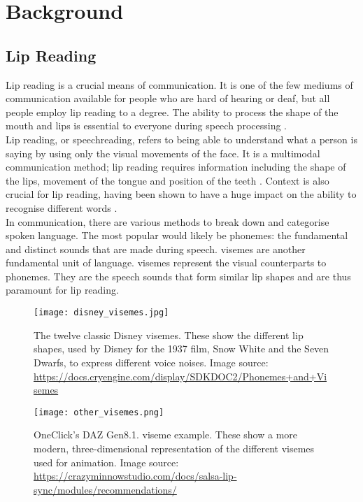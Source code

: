 \chapter{Background}
\label{cha:background}
\graphicspath{ {./resources/} }

\section{Lip Reading}
\label{sec: Lip Reading}
Lip reading is a crucial means of communication. It is one of the few mediums of communication available for people who are hard of hearing or deaf, but all people employ lip reading to a degree. The ability to process the shape of the mouth and lips is essential to everyone during speech processing \cite{lip_reading_used_by_everyone}.\\
Lip reading, or speechreading, refers to being able to understand what a person is saying by using only the visual movements of the face. It is a multimodal communication method; lip reading requires information including the shape of the lips, movement of the tongue and position of the teeth \cite{lip_reading_multimodal}. Context is also crucial for lip reading, having been shown to have a huge impact on the ability to recognise different words \cite{Effects-of-context-type-on-lipreading}.\\
In communication, there are various methods to break down and categorise spoken language. The most popular would likely be \gls{phoneme}s: the fundamental and distinct sounds that are made during speech.
\Gls{viseme}s are another fundamental unit of language. \Gls{viseme}s represent the visual counterparts to \gls{phoneme}s. They are the speech sounds that form similar lip shapes and are thus paramount for lip reading.\\ 
\begin{figure}
\centering
\texttt{[image: disney\_visemes.jpg]}
\caption[The twelve classic Disney \gls{viseme}s.]{The twelve classic Disney \gls{viseme}s. These show the different lip shapes, used by Disney for the 1937 film, Snow White and the Seven Dwarfs, to express different voice noises. Image source: \url{https://docs.cryengine.com/display/SDKDOC2/Phonemes+and+Visemes}}
\label{fig:disney visemes}
\end{figure}
\begin{figure}
\centering
\texttt{[image: other\_visemes.png]}
\caption[OneClick's DAZ Gen8.1 \gls{viseme} example]{OneClick's DAZ Gen8.1. viseme example. These show a more modern, three-dimensional representation of the different \gls{viseme}s used for animation. Image source: \url{https://crazyminnowstudio.com/docs/salsa-lip-sync/modules/recommendations/}}
\label{fig:other visemes}
\end{figure}
